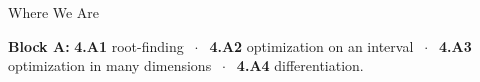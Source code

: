

\graphicspath{{./figures/}}





\makedecktitle

\begin{frame}{Where We Are}
\vspace{-1mm}
\begin{center}
\small \textbf{Block A:} \textbf{4.A1} root-finding $\;\cdot\;$ \textbf{4.A2} optimization on an interval $\;\cdot\;$ \textbf{4.A3} optimization in many dimensions $\;\cdot\;$ \textbf{4.A4} differentiation.
\end{center}
\end{frame}

